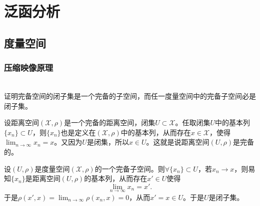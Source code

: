 \chapter{泛函分析}
\section{度量空间}
\subsection{压缩映像原理}
\begin{exercise}
\hfill\\
证明完备空间的闭子集是一个完备的子空间，而任一度量空间中的完备子空间必是闭子集。

设距离空间$(\mathscr{X},\rho)$是一个完备的距离空间，闭集$U\subset\mathscr{X}$。任取闭集$U$中的基本列$\{x_n\}\subset U$，则$\{x_n\}$也是定义在$(\mathscr{X},\rho)$中的基本列，从而存在$x\in\mathscr{X}$，使得$\lim_{n\rightarrow\infty}x_n=x$。又因为$U$是闭集，所以$x\in U$。这就是说距离空间$(U,\rho)$是完备的。

设$(U,\rho)$是度量空间$(\mathscr{X},\rho)$的一个完备子空间。则$\forall\{x_n\}\subset U$，若$x_n\rightarrow x$，则易知$\{x_n\}$是距离空间$(U,\rho)$的基本列，从而存在$x'\in U$使得$$\lim_{n\rightarrow\infty}x_n=x'.$$
于是$\rho(x',x)=\lim_{n\rightarrow\infty}\rho(x_n,x)=0$，从而$x'=x\in U$。于是$U$是闭子集。
\end{exercise}

